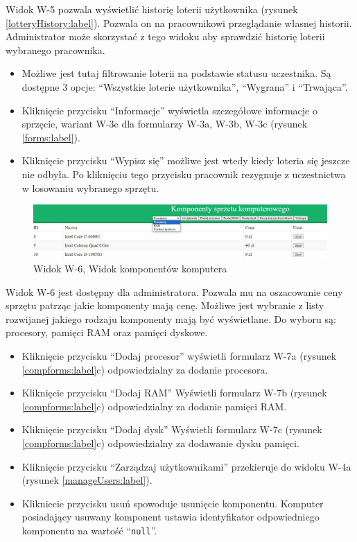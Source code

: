 Widok W-5 pozwala wyświetlić historię loterii użytkownika (rysunek \ref{lotteryHistory:label}). Pozwala on na pracownikowi przeglądanie własnej historii. Administrator może skorzystać z tego widoku aby sprawdzić historię loterii wybranego pracownika.
\begin {itemize}
	\item Możliwe jest tutaj filtrowanie loterii na podstawie statusu uczestnika. Są dostępne 3 opcje: "`Wszystkie loterie użytkownika"', "`Wygrana"' i "`Trwająca"'.
	\item Kliknięcie przycisku "`Informacje"' wyświetla szczegółowe informacje o sprzęcie, wariant \mbox{W-3e} dla formularzy W-3a, W-3b, W-3c (rysunek \ref{forms:label}).
	\item Kliknięcie przycisku "`Wypisz się"' możliwe jest wtedy kiedy loteria się jeszcze nie odbyła. Po kliknięciu tego przycisku pracownik rezygnuje z uczestnictwa w losowaniu wybranego sprzętu.
\end{itemize} 




\begin{figure}[h]
		\centering
    \includegraphics[width=\linewidth]{rys05/view/components.pdf}
    \caption{Widok W-6, Widok komponentów komputera}
    \label{components:label}
\end{figure}

Widok W-6 jest dostępny dla administratora. Pozwala mu na oszacowanie ceny sprzętu patrząc jakie komponenty mają cenę. Możliwe jest wybranie z listy rozwijanej jakiego rodzaju komponenty mają być wyświetlane. Do wyboru są: procesory, pamięci RAM oraz pamięci dyskowe.
\begin{itemize}
	\item Kliknięcie przycisku "`Dodaj procesor"' wyświetli formularz W-7a (rysunek \ref{compforms:label}c) odpowiedzialny za dodanie procesora.
	\item Kliknięcie przycisku "`Dodaj RAM"' Wyświetli formularz W-7b (rysunek \ref{compforms:label}c) odpowiedzialny za dodanie pamięci RAM.
	\item Kliknięcie przycisku "`Dodaj dysk"' Wyświetli formularz W-7c (rysunek \ref{compforms:label}c) odpowiedzialny za dodawanie dysku pamięci.
	\item Kliknięcie przycisku "`Zarządzaj użytkownikami"' przekieruje do widoku W-4a (rysunek \ref{manageUsers:label}).
	\item Klikniecie przycisku usuń spowoduje usunięcie komponentu. Komputer posiadający usuwany komponent ustawia identyfikator odpowiedniego komponentu na wartość "`\texttt{null}"'.
\end{itemize} 

